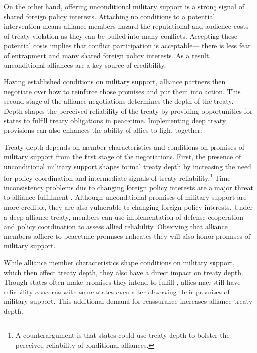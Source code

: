 \documentclass[12pt]{article}
\begin{document}
On the other hand, offering unconditional military support is a strong signal of shared foreign policy interests. 
Attaching no conditions to a potential intervention means alliance members hazard the reputational \citep{Gibler2008, Crescenzietal2012} and audience \citep{Fearon1997} costs of treaty violation as they can be pulled into many conflicts. 
Accepting these potential costs implies that conflict participation is acceptable--- there is less fear of entrapment and many shared foreign policy interests. 
As a result, unconditional alliances are a key source of credibility. 


Having established conditions on military support, alliance partners then negotiate over how to reinforce those promises and put them into action. 
This second stage of the alliance negotiations determines the depth of the treaty. 
Depth shapes the perceived reliability of the treaty by providing opportunities for states to fulfill treaty obligations in peacetime. 
Implementing deep treaty provisions can also enhances the ability of allies to fight together. 


Treaty depth depends on member characteristics and conditions on promises of military support from the first stage of the negotiations.
First, the presence of unconditional military support shapes formal treaty depth by increasing the need for policy coordination and intermediate signals of treaty reliability.\footnote{A counterargument is that states could use treaty depth to bolster the perceived reliability of conditional alliances.}
Time-inconsistency problems due to changing foreign policy interests are a major threat to alliance fulfillment 
\citep{LeedsSavun2007}. 
Although unconditional promises of military support are more credible, they are also vulnerable to changing foreign policy interests. 
Under a deep alliance treaty, members can use implementation of defense cooperation and policy coordination to assess allied reliability. 
Observing that alliance members adhere to peacetime promises indicates they will also honor promises of military support. 


While alliance member characteristics shape conditions on military support, which then affect treaty depth, they also have a direct impact on treaty depth.  
Though states often make promises they intend to fulfill \citep{DownsRockeBarsoom1996, Chibaetal2015}, allies may still have reliability concerns with some states even after observing their promises of military support. 
This additional demand for reassurance increases alliance treaty depth. 
\end{document}
